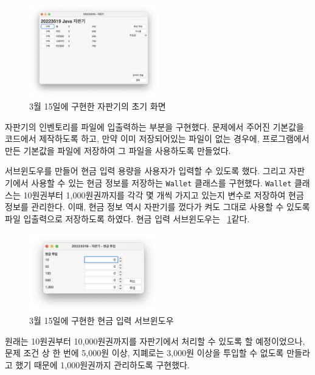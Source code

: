 \documentclass{oblivoir}
\newcommand{\figref}[1]{\figurename~\ref{#1}}
\begin{document}
    \begin{figure}[h]
        \centering
        \includegraphics[width=0.5\textwidth]{images/dev-snapshop/0315-vending-machine}
        \caption{3월 15일에 구현한 자판기의 초기 화면}
    \end{figure}

    자판기의 인벤토리를 파일에 입출력하는 부분을 구현했다.
    문제에서 주어진 기본값을 코드에서 제작하도록 하고,
    만약 이미 저장되어있는 파일이 없는 경우에, 프로그램에서 만든 기본값을 파일에 저장하여
    그 파일을 사용하도록 만들었다.

    서브윈도우를 만들어 현금 입력 용량을 사용자가 입력할 수 있도록 했다.
    그리고 자판기에서 사용할 수 있는 현금 정보를 저장하는 \texttt{Wallet} 클래스를 구현했다.
    \texttt{Wallet} 클래스는 10원권부터 1,000원권까지를 각각 몇 개씩 가지고 있는지 변수로 저장하여 현금 정보를 관리한다.
    이때, 현금 정보 역시 자판기를 껐다가 켜도 그대로 사용할 수 있도록 파일 입출력으로 저장하도록 하였다.
    현금 입력 서브윈도우는 \figref{fig:0315-cash-input-prompt}\과 같다.
    \begin{figure}[h]
        \centering
        \includegraphics[width=0.5\textwidth]{images/dev-snapshop/0315-cash-input-prompt}
        \caption{3월 15일에 구현한 현금 입력 서브윈도우}
        \label{fig:0315-cash-input-prompt}
    \end{figure}

    원래는 10원권부터 10,000원권까지를 자판기에서 처리할 수 있도록 할 예정이었으나,
    문제 조건 상 한 번에 5,000원 이상, 지폐로는 3,000원 이상을 투입할 수 없도록 만들라고 했기 때문에
    1,000원권까지 관리하도록 구현했다.
\end{document}
